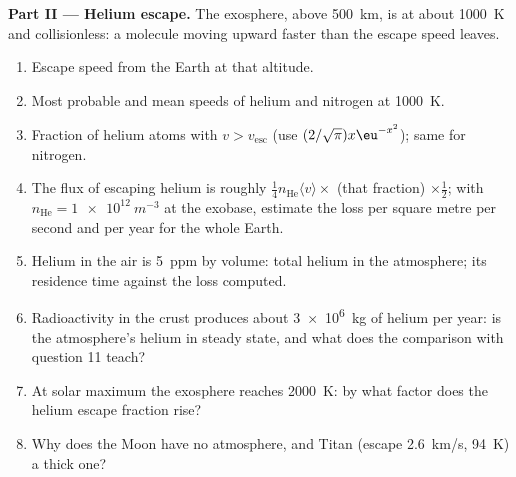 \begin{problem}
\textbf{Part II --- Helium escape.}
The exosphere, above \qty{500}{km}, is at about \qty{1000}{K} and
collisionless: a molecule moving upward faster than the escape speed
leaves.
\begin{enumerate}[resume]
  \item Escape speed from the Earth at that altitude.
  \item Most probable and mean speeds of helium and nitrogen at
        \qty{1000}{K}.
  \item Fraction of helium atoms with $v > v_{\text{esc}}$ (use
        $(2/\sqrt\pi)x\eu^{-x^2}$); same for nitrogen.
  \item The flux of escaping helium is roughly $\tfrac14n_{\text{He}}\langle
        v\rangle \times$ (that fraction) $\times\tfrac12$; with $n_{\text{He}}
        = \qty{1e12}{m^{-3}}$ at the exobase, estimate the loss per square
        metre per second and per year for the whole Earth.
  \item Helium in the air is \qty{5}{ppm} by volume: total helium in the
        atmosphere; its residence time against the loss computed.
  \item Radioactivity in the crust produces about \qty{3e6}{kg} of helium
        per year: is the atmosphere's helium in steady state, and what
        does the comparison with question 11 teach?
  \item At solar maximum the exosphere reaches \qty{2000}{K}: by what
        factor does the helium escape fraction rise?
  \item Why does the Moon have no atmosphere, and Titan (escape
        \qty{2.6}{km/s}, \qty{94}{K}) a thick one?
\end{enumerate}


\end{problem}
